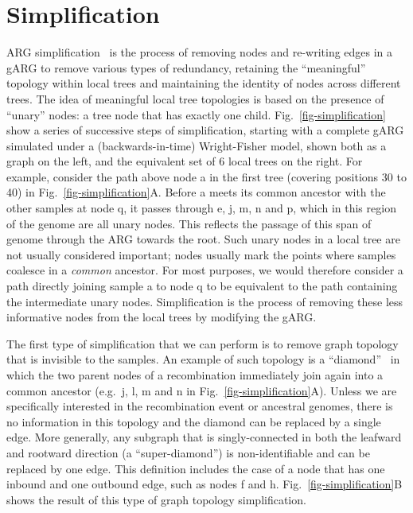 \documentclass{article}
\begin{document}
\section*{Simplification}\label{ARG_simplification}
ARG simplification~\citep{kelleher2018efficient} is the process
of removing nodes and re-writing edges in a gARG to remove
various types of redundancy,
retaining the ``meaningful'' topology within local trees
and maintaining the identity of nodes across different trees.
The idea of meaningful local tree topologies is based on the
presence of ``unary'' nodes: a tree node that has exactly
one child. Fig.~\ref{fig-simplification} show a series of successive steps of
simplification, starting with a complete gARG simulated under a
(backwards-in-time) Wright-Fisher
model, shown both as a graph on the left, and the equivalent set of 6
local trees on the right.
For example, consider the path above node
\textsf{a} in the first tree (covering positions 30 to 40)
in Fig.~\ref{fig-simplification}A.
Before \textsf{a} meets its common ancestor with the other samples at
node \textsf{q}, it passes through \textsf{e}, \textsf{j}, \textsf{m}, \textsf{n} and
\textsf{p}, which in this region of the genome are all unary nodes.
This reflects the passage of this span of genome through the ARG towards the root.
Such unary nodes in a local tree are not usually considered important;
nodes usually mark the points where samples coalesce in a
 \emph{common} ancestor. For most purposes, we would therefore consider a path directly
joining sample \textsf{a} to node \textsf{q} to be equivalent to the path
containing the intermediate unary nodes. Simplification is the process of removing
these less informative nodes from the local trees by modifying the gARG.

The first type of simplification that we can perform is to remove
graph topology that is invisible to the samples.
An example of such topology is a
``diamond''~\citep{rasmussen2014genome}
in which the two parent nodes of a recombination immediately
join again into a common ancestor (e.g.~\textsf{j}, \textsf{l}, \textsf{m}
and \textsf{n} in Fig.~\ref{fig-simplification}A).
Unless we are specifically
interested in the recombination event or ancestral genomes,
there is no information in this topology and the diamond can be
replaced by a single edge. More generally, any
subgraph that is singly-connected in both the leafward and
rootward direction (a ``super-diamond'') is non-identifiable and can be
replaced by one edge. This definition includes the case
of a node that has one inbound and one outbound edge, such as
nodes \textsf{f} and \textsf{h}.
Fig.~\ref{fig-simplification}B shows the result of this type of
graph topology simplification.
\end{document}
